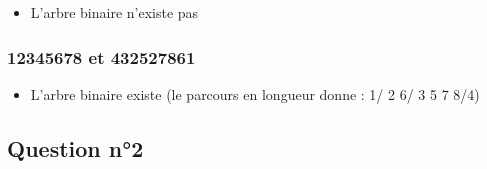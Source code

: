 \documentclass[11pt]{article}
\begin{document}
\begin{itemize}
\item L'arbre binaire n'existe pas
\end{itemize}

\subsubsection{12345678 et 432527861}
\label{sec:orgca3620a}

\begin{itemize}
\item L'arbre binaire existe (le parcours en longueur donne : 1/ 2 6/ 3 5 7 8/4)
\end{itemize}



\subsection{Question n°2}
\label{sec:orgeff16e5}
\end{document}

